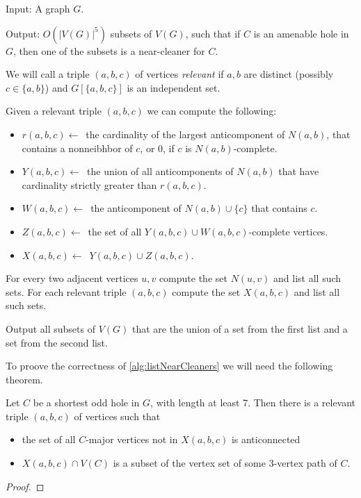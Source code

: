 \documentclass{report}
\begin{document}
\begin{alg}
	\label{alg:listNearCleaners}
	Input: A graph $G$.

	\noindent Output: $O(|V(G)|^5)$ subsets of $V(G)$, such that if $C$ is an amenable hole in $G$, then one of the subsets is a near-cleaner for $C$.
\end{alg}
\begin{algtext}
	We will call a triple $(a, b, c)$ of vertices \emph{relevant} if $a, b$ are distinct (possibly $c \in \{a, b\}$) and $G[\{a,b,c\}]$ is an independent set.
	
	Given a relevant triple $(a, b, c)$ we can compute the following:
	\begin{itemize}
		\item $r(a,b,c) \leftarrow$~the cardinality of the largest anticomponent of $N(a, b)$, that contains a nonneibhbor of $c$, or 0, if $c$ is $N(a, b)$-complete.
		\item $Y(a,b,c) \leftarrow$~the union of all anticomponents of $N(a, b)$ that have cardinality strictly greater than $r(a, b, c)$.
		\item $W(a, b, c) \leftarrow$~the anticomponent of $N(a,b) \cup \{c\}$ that contains $c$.
		\item $Z(a, b, c) \leftarrow$~the set of all $Y(a, b, c) \cup W(a,b,c)$-complete vertices.
		\item $X(a, b, c) \leftarrow$~$Y(a,b,c) \cup Z(a,b,c)$.
	\end{itemize}

	For every two adjacent vertices $u, v$ compute the set $N(u, v)$ and list all such sets.
	For each relevant triple $(a,b,c)$ compute the set $X(a,b,c)$ and list all such sets.

	Output all subsets of $V(G)$ that are the union of a set from the first list and a set from the second list.
\end{algtext}

To proove the correctness of \cref{alg:listNearCleaners} we will need the following theorem.

\begin{theorem}[9.1 of \cite{MC05}]
	\label{thm:91}
	Let $C$ be a shortest odd hole in $G$, with length at least 7. Then there is a relevant triple $(a, b, c)$ of vertices such that
	\begin{itemize}
		\item the set of all $C$-major vertices not in $X(a, b, c)$ is anticonnected
		\item $X(a, b, c) \cap V(C)$ is a subset of the vertex set of some 3-vertex path of $C$.
	\end{itemize}
\end{theorem}
\begin{proof}
\end{proof}
\end{document}
